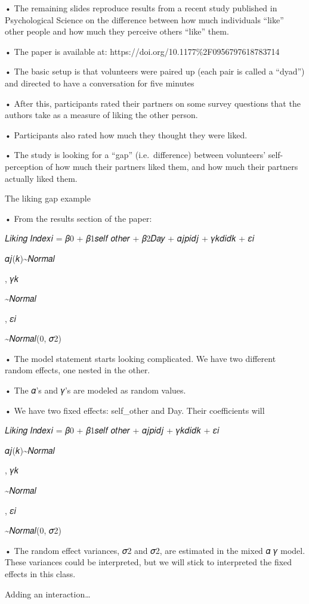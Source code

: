 \documentclass[
  letterpaper,
  DIV=11,
  numbers=noendperiod]{scrreprt}
\begin{document}
• The remaining slides reproduce results from a recent study published
in Psychological Science on the difference between how much individuals
``like'' other people and how much they perceive others ``like'' them.

• The paper is available at: https://doi.org/10.1177\%2F0956797618783714

• The basic setup is that volunteers were paired up (each pair is called
a ``dyad'') and directed to have a conversation for five minutes

• After this, participants rated their partners on some survey questions
that the authors take as a measure of liking the other person.

• Participants also rated how much they thought they were liked.

• The study is looking for a ``gap'' (i.e.~difference) between
volunteers' self-perception of how much their partners liked them, and
how much their partners actually liked them.

The liking gap example

• From the results section of the paper:

𝐿𝑖𝑘𝑖𝑛𝑔 𝐼𝑛𝑑𝑒𝑥𝑖 = 𝛽0 + 𝛽1𝑠𝑒𝑙𝑓 𝑜𝑡ℎ𝑒𝑟 + 𝛽2𝐷𝑎𝑦 + 𝛼𝑗𝑝𝑖𝑑𝑗 + 𝛾𝑘𝑑𝑖𝑑𝑘 + 𝜀𝑖

𝛼𝑗(𝑘)\textasciitilde 𝑁𝑜𝑟𝑚𝑎𝑙

, 𝛾𝑘

\textasciitilde 𝑁𝑜𝑟𝑚𝑎𝑙

, 𝜀𝑖

\textasciitilde 𝑁𝑜𝑟𝑚𝑎𝑙(0, 𝜎2)

• The model statement starts looking complicated. We have two different
random effects, one nested in the other.

• The 𝛼's and 𝛾's are modeled as random values.

• We have two fixed effects: self\_other and Day. Their coefficients
will

𝐿𝑖𝑘𝑖𝑛𝑔 𝐼𝑛𝑑𝑒𝑥𝑖 = 𝛽0 + 𝛽1𝑠𝑒𝑙𝑓 𝑜𝑡ℎ𝑒𝑟 + 𝛼𝑗𝑝𝑖𝑑𝑗 + 𝛾𝑘𝑑𝑖𝑑𝑘 + 𝜀𝑖

𝛼𝑗(𝑘)\textasciitilde 𝑁𝑜𝑟𝑚𝑎𝑙

, 𝛾𝑘

\textasciitilde 𝑁𝑜𝑟𝑚𝑎𝑙

, 𝜀𝑖

\textasciitilde 𝑁𝑜𝑟𝑚𝑎𝑙(0, 𝜎2)

• The random effect variances, 𝜎2 and 𝜎2, are estimated in the mixed 𝛼 𝛾
model. These variances could be interpreted, but we will stick to
interpreted the fixed effects in this class.

Adding an interaction\ldots{}
\end{document}
